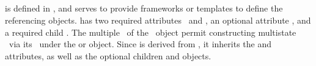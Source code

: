\label{def:OneToOneBinding}

\clearpage

\subsection{}
\label{def:SpeciesFeatureType}

 is defined in , and serves to provide frameworks or templates to define the referencing \SpeciesFeature objects.  has two required attributes \idAtt\ and \occurAtt, an optional attribute \nameAtt,  and a required child \listOfPossibleSpeciesFeatureValues. The multiple \possibleSpeciesFeatureValues\ of the \ListOfPossibleSpeciesFeatureValues\ object permit constructing multistate \species\ via its \speciesFeatures\ under the \ListOfSpeciesFeatures or \SubListOfSpeciesFeatures object. Since  is derived from , it inherits the  and  attributes, as well as the optional children  and  objects. 

